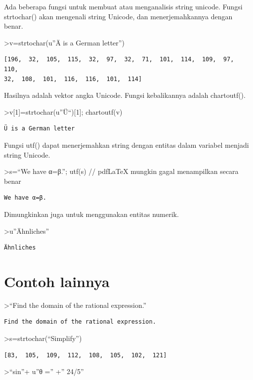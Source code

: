 \documentclass[
]{book}
\begin{document}
Ada beberapa fungsi untuk membuat atau menganalisis string unicode. Fungsi strtochar() akan mengenali string Unicode, dan menerjemahkannya dengan benar.

\textgreater v=strtochar(u''Ä is a German letter'')

\begin{verbatim}
[196,  32,  105,  115,  32,  97,  32,  71,  101,  114,  109,  97,  110,
32,  108,  101,  116,  116,  101,  114]
\end{verbatim}

Hasilnya adalah vektor angka Unicode. Fungsi kebalikannya adalah chartoutf().

\textgreater v{[}1{]}=strtochar(u''Ü``){[}1{]}; chartoutf(v)

\begin{verbatim}
Ü is a German letter
\end{verbatim}

Fungsi utf() dapat menerjemahkan string dengan entitas dalam variabel menjadi string Unicode.

\textgreater s=``We have α=β.''; utf(s) // pdfLaTeX mungkin gagal menampilkan secara benar

\begin{verbatim}
We have α=β.
\end{verbatim}

Dimungkinkan juga untuk menggunakan entitas numerik.

\textgreater u''Ähnliches''

\begin{verbatim}
Ähnliches
\end{verbatim}

\section{Contoh lainnya}\label{contoh-lainnya-3}

\textgreater{}``Find the domain of the rational expression.''

\begin{verbatim}
Find the domain of the rational expression.
\end{verbatim}

\textgreater s=strtochar(``Simplify'')

\begin{verbatim}
[83,  105,  109,  112,  108,  105,  102,  121]
\end{verbatim}

\textgreater{}``sin''+ u''θ ='' +'' 24/5''
\end{document}
